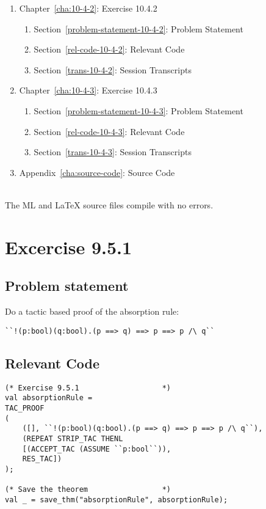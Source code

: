 \documentclass{report}
\begin{document}
\begin{description}
\begin{enumerate}[{}]
\begin{enumerate}[{}]
    \end{enumerate}
  \item Chapter~\ref{cha:10-4-2}: Exercise 10.4.2
    \begin{enumerate}[{}]
    \item Section~\ref{problem-statement-10-4-2}: Problem Statement
    \item Section~\ref{rel-code-10-4-2}: Relevant Code
    \item Section~\ref{trans-10-4-2}: Session Transcripts
    \end{enumerate}
  \item Chapter~\ref{cha:10-4-3}: Exercise 10.4.3
    \begin{enumerate}[{}]
    \item Section~\ref{problem-statement-10-4-3}: Problem Statement
    \item Section~\ref{rel-code-10-4-3}: Relevant Code
    \item Section~\ref{trans-10-4-3}: Session Transcripts
    \end{enumerate}
 \item Appendix~\ref{cha:source-code}: Source Code
  \end{enumerate}
\item[Reproducibility in ML and \LaTeX{}] \ \\
  The ML and \LaTeX{} source files compile with no errors.
\end{description}


\chapter{Excercise 9.5.1}
\label{cha:9-5-1}

\section{Problem statement}
\label{problem-statement-9-5-1}
Do a tactic based proof of the absorption rule:
\begin{lstlisting}[frame=tblr]
 ``!(p:bool)(q:bool).(p ==> q) ==> p ==> p /\ q``
\end{lstlisting}

\section{Relevant Code}
\label{rel-code-9-5-1}
\begin{lstlisting}[frame=TBlr]
(* Exercise 9.5.1					*)
val absorptionRule =
TAC_PROOF
(
	([], ``!(p:bool)(q:bool).(p ==> q) ==> p ==> p /\ q``),
	(REPEAT STRIP_TAC THENL
	[(ACCEPT_TAC (ASSUME ``p:bool``)),
	RES_TAC])
);

(* Save the theorem					*)
val _ = save_thm("absorptionRule", absorptionRule);

\end{lstlisting}
\end{document}
